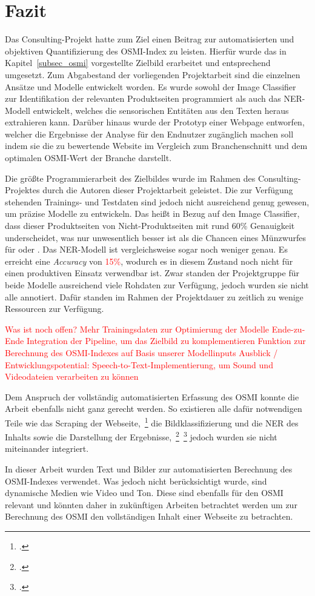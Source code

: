 \section{Fazit}
Das Consulting-Projekt hatte zum Ziel einen Beitrag zur automatisierten und objektiven Quantifizierung des
\ac{OSMI}-Index zu leisten.
Hierfür wurde das in Kapitel~\ref{subsec_osmi} vorgestellte Zielbild erarbeitet und entsprechend umgesetzt.
Zum Abgabestand der vorliegenden Projektarbeit sind die einzelnen Ansätze und Modelle entwickelt worden.
Es wurde sowohl der Image Classifier zur Identifikation der relevanten Produktseiten programmiert als auch das \ac{NER}-Modell
entwickelt, welches die sensorischen Entitäten aus den Texten heraus extrahieren kann.
Darüber hinaus wurde der Prototyp einer Webpage entworfen, welcher die Ergebnisse der Analyse
für den Endnutzer zugänglich machen soll indem sie die zu bewertende Website im Vergleich zum Branchenschnitt und dem optimalen \ac{OSMI}-Wert
der Branche darstellt.

Die größte Programmierarbeit des Zielbildes wurde im Rahmen des Consulting-Projektes durch die Autoren dieser Projektarbeit
geleistet.
Die zur Verfügung stehenden Trainings- und Testdaten sind jedoch nicht ausreichend genug gewesen, um präzise Modelle
zu entwickeln.
Das heißt in Bezug auf den Image Classifier, dass dieser Produktseiten von Nicht-Produktseiten mit rund 60\% Genauigkeit underscheidet,
was nur unwesentlich besser ist als die Chancen eines Münzwurfes für \grqq{} oder \grqq{}.
Das \ac{NER}-Modell ist vergleichsweise sogar noch weniger genau. Es erreicht eine \textit{Accuracy} von \textcolor{red}{15\%},
wodurch es in diesem Zustand noch nicht für einen produktiven Einsatz verwendbar ist. 
Zwar standen der Projektgruppe für beide Modelle ausreichend viele Rohdaten zur Verfügung, jedoch wurden sie nicht alle annotiert. Dafür standen im Rahmen der Projektdauer zu zeitlich zu
wenige Ressourcen zur Verfügung.


\textcolor{red}{
Was ist noch offen?
Mehr Trainingsdaten zur Optimierung der Modelle
Ende-zu-Ende Integration der Pipeline, um das Zielbild zu komplementieren
Funktion zur Berechnung des OSMI-Indexes auf Basis unserer Modellinputs
}
\textcolor{red}{
Ausblick  / Entwicklungspotential:
Speech-to-Text-Implementierung, um Sound und Videodateien verarbeiten zu können
}

Dem Anspruch der vollständig automatisierten Erfassung des \ac{OSMI} konnte die Arbeit ebenfalls nicht ganz gerecht werden. So existieren alle dafür notwendigen Teile wie das Scraping der Webseite,~\footcite[\vglf][]{ostkamp2022a} die Bildklassifizierung und die \acl{NER} des Inhalts sowie die Darstellung der Ergebnisse,~\footcite[\vglf][]{ostkamp2022b}~\footcite[\vglf][]{ostkamp2022c}
jedoch wurden sie nicht miteinander integriert.

In dieser Arbeit wurden Text und Bilder zur automatisierten Berechnung des \ac{OSMI}-Indexes verwendet. Was jedoch nicht berücksichtigt wurde, sind dynamische Medien wie Video und Ton.
Diese sind ebenfalls für den OSMI relevant und könnten daher in zukünftigen Arbeiten betrachtet werden um zur Berechnung des OSMI den vollständigen Inhalt einer Webseite zu betrachten.